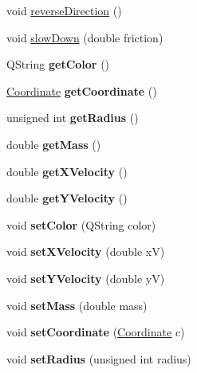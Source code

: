 \begin{DoxyCompactItemize}
\item 
void \mbox{\hyperlink{class_ball_a4c0af1b64acf876fafb8a85fc470772f}{reverse\+Direction}} ()
\item 
void \mbox{\hyperlink{class_ball_a1557e7212e496a96aab9ca9a683dfca2}{slow\+Down}} (double friction)
\item 
\mbox{\label{class_ball_a58bf60524be0060b255108eb996413e3}} 
Q\+String {\bfseries get\+Color} ()
\item 
\mbox{\label{class_ball_a0b0099645dd017bc65634425b67ad79f}} 
\mbox{\hyperlink{class_coordinate}{Coordinate}} {\bfseries get\+Coordinate} ()
\item 
\mbox{\label{class_ball_ad2dc00de05b971347604e5e08a952424}} 
unsigned int {\bfseries get\+Radius} ()
\item 
\mbox{\label{class_ball_ae02678b9e5ba6ed64906561c1e390c34}} 
double {\bfseries get\+Mass} ()
\item 
\mbox{\label{class_ball_a4447db4f0cef8d6cdbee2e6be9dd6137}} 
double {\bfseries get\+X\+Velocity} ()
\item 
\mbox{\label{class_ball_abef8bebba062d9151c1af503a9ed2569}} 
double {\bfseries get\+Y\+Velocity} ()
\item 
\mbox{\label{class_ball_aa914f0a460330e53a7974dc2be011c89}} 
void {\bfseries set\+Color} (Q\+String color)
\item 
\mbox{\label{class_ball_a928aa54ea9b09e644bb23d0fa75a720d}} 
void {\bfseries set\+X\+Velocity} (double xV)
\item 
\mbox{\label{class_ball_a439b6a930c65a7ec38262930c391563c}} 
void {\bfseries set\+Y\+Velocity} (double yV)
\item 
\mbox{\label{class_ball_ad76ef4fa5aa966fcdebb447d17fdb445}} 
void {\bfseries set\+Mass} (double mass)
\item 
\mbox{\label{class_ball_a0d0c12d5f7c970fa8d686bedfb34cae1}} 
void {\bfseries set\+Coordinate} (\mbox{\hyperlink{class_coordinate}{Coordinate}} c)
\item 
\mbox{\label{class_ball_a4f90616b98909608b0ab169abed4ca3c}} 
void {\bfseries set\+Radius} (unsigned int radius)
\end{DoxyCompactItemize}



